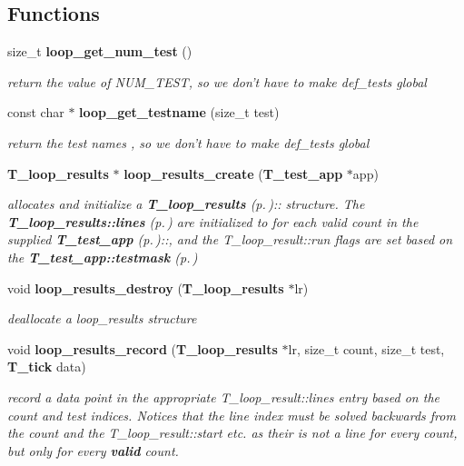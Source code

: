 \subsection*{Functions}
\begin{CompactItemize}
\item 
size\_\-t {\bf loop\_\-get\_\-num\_\-test} ()
\begin{CompactList}\small\item\em return the value of NUM\_\-TEST, so we don't have to make def\_\-tests global\item\end{CompactList}\item 
const char $\ast$ {\bf loop\_\-get\_\-testname} (size\_\-t test)
\begin{CompactList}\small\item\em return the test names , so we don't have to make def\_\-tests global\item\end{CompactList}\item 
{\bf T\_\-loop\_\-results} $\ast$ {\bf loop\_\-results\_\-create} ({\bf T\_\-test\_\-app} $\ast$app)
\begin{CompactList}\small\item\em allocates and initialize a {\bf T\_\-loop\_\-results} {\rm (p.\,\pageref{structT__loop__results})}:: structure. The {\bf T\_\-loop\_\-results::lines} {\rm (p.\,\pageref{structT__loop__results_m4})} are initialized to for each valid count in the supplied {\bf T\_\-test\_\-app} {\rm (p.\,\pageref{structT__test__app})}::, and the T\_\-loop\_\-result::run flags are set based on the {\bf T\_\-test\_\-app::testmask} {\rm (p.\,\pageref{structT__test__app_m13})}\item\end{CompactList}\item 
void {\bf loop\_\-results\_\-destroy} ({\bf T\_\-loop\_\-results} $\ast$lr)
\begin{CompactList}\small\item\em deallocate a loop\_\-results structure\item\end{CompactList}\item 
void {\bf loop\_\-results\_\-record} ({\bf T\_\-loop\_\-results} $\ast$lr, size\_\-t count, size\_\-t test, {\bf T\_\-tick} data)
\begin{CompactList}\small\item\em record a data point in the appropriate T\_\-loop\_\-result::lines entry based on the count and test indices. Notices that the line index must be solved backwards from the count and the T\_\-loop\_\-result::start etc. as their is not a line for every count, but only for every {\bf valid} count.\item\end{CompactList}\item 

\end{CompactItemize}
